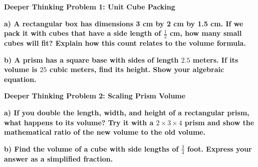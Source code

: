 \documentclass[12pt, letterpaper, fleqn]{article}
\begin{document}
\begin{tcolorbox}[colback=yellow!15, colframe=orange, boxrule=1.5pt, arc=4mm, left=6mm, right=6mm, top=5mm, bottom=5mm]
\textbf{Deeper Thinking Problem 1: Unit Cube Packing}

\medskip

\noindent
\textbf{a) A rectangular box has dimensions 3 cm by 2 cm by 1.5 cm. If we pack it with cubes that have a side length of $\frac{1}{2}$ cm, how many small cubes will fit? Explain how this count relates to the volume formula.}

\vspace{2cm}

\noindent
\textbf{b) A prism has a square base with sides of length $2.5$ meters. If its volume is $25$ cubic meters, find its height. Show your algebraic equation.}

\vspace{2cm}
\end{tcolorbox}
\newpage

\begin{tcolorbox}[colback=yellow!15, colframe=orange, boxrule=1.5pt, arc=4mm, left=6mm, right=6mm, top=5mm, bottom=5mm]
\textbf{Deeper Thinking Problem 2: Scaling Prism Volume}

\medskip

\noindent
\textbf{a) If you double the length, width, and height of a rectangular prism, what happens to its volume? Try it with a $2 \times 3 \times 4$ prism and show the mathematical ratio of the new volume to the old volume.}

\vspace{2cm}

\noindent
\textbf{b) Find the volume of a cube with side lengths of $\frac{3}{4}$ foot. Express your answer as a simplified fraction.}

\vspace{2cm}
\end{tcolorbox}
\newpage
\end{document}
